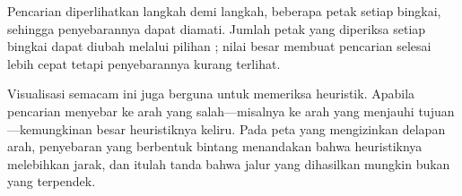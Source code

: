Pencarian diperlihatkan langkah demi langkah, beberapa petak setiap bingkai,
sehingga penyebarannya dapat diamati. Jumlah petak yang diperiksa setiap
bingkai dapat diubah melalui pilihan ; nilai besar membuat
pencarian selesai lebih cepat tetapi penyebarannya kurang terlihat.

\begin{tipsbox}
Visualisasi semacam ini juga berguna untuk memeriksa heuristik. Apabila
pencarian menyebar ke arah yang salah---misalnya ke arah yang menjauhi
tujuan---kemungkinan besar heuristiknya keliru. Pada peta yang mengizinkan
delapan arah, penyebaran yang berbentuk bintang menandakan bahwa heuristiknya
melebihkan jarak, dan itulah tanda bahwa jalur yang dihasilkan mungkin bukan
yang terpendek.
\end{tipsbox}
